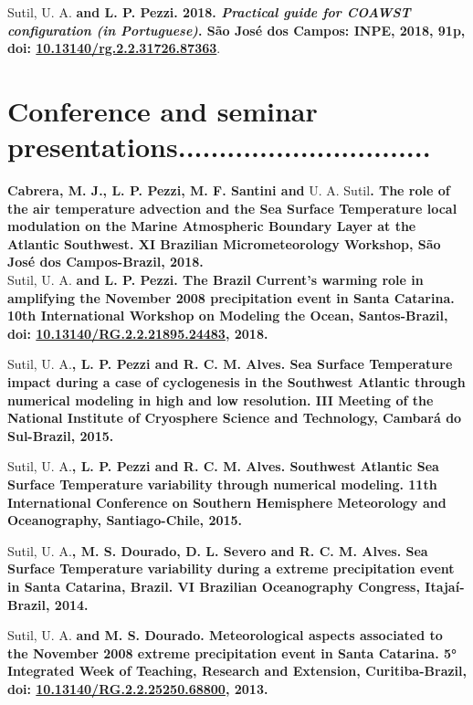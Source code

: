 \documentclass[letterpaper]{twentysecondcv} %
\begin{document}
Sutil, U. A.\textbf{ and L. P. Pezzi. 2018. \textit{Practical guide for COAWST configuration (in Portuguese)}. São José dos Campos: INPE, 2018, 91p, doi: \textcolor{mainblue}{\href{https://doi.org/10.13140/rg.2.2.31726.87363}{10.13140/rg.2.2.31726.87363}}}.


\newpage
\makeprofile
\section{Conference and seminar presentations\textcolor{maingray}{...............................}}

\textbf{Cabrera, M. J., L. P. Pezzi, M. F. Santini and} U. A. Sutil\textbf{. The role of the air temperature advection and the Sea Surface Temperature local modulation on the Marine Atmospheric Boundary Layer at the Atlantic Southwest. XI Brazilian Micrometeorology Workshop, São José dos Campos-Brazil, 2018.} \\

Sutil, U. A.\textbf{ and L. P. Pezzi. The Brazil Current's warming role in amplifying the November 2008 precipitation event in Santa Catarina. 10th International Workshop on Modeling the Ocean, Santos-Brazil, doi: \textcolor{mainblue}{\href{https://www.researchgate.net/publication/329070547_Role_of_Brazil_Current_warming_in_amplifying_2008_Santa_Catarina_extreme_precipitation_event}{10.13140/RG.2.2.21895.24483}}, 2018.}

Sutil, U. A.\textbf{, L. P. Pezzi and R. C. M. Alves. Sea Surface Temperature impact during a case of cyclogenesis in the Southwest Atlantic through numerical modeling in high and low resolution. III Meeting of the National Institute of Cryosphere Science and Technology, Cambará do Sul-Brazil, 2015.}

Sutil, U. A.\textbf{, L. P. Pezzi and R. C. M. Alves. Southwest Atlantic Sea Surface Temperature variability through numerical modeling. 11th International Conference on Southern Hemisphere Meteorology and Oceanography, Santiago-Chile, 2015.}

Sutil, U. A.\textbf{, M. S. Dourado, D. L. Severo and R. C. M. Alves. Sea Surface Temperature variability during a extreme precipitation event in Santa Catarina, Brazil. VI Brazilian Oceanography Congress, Itajaí-Brazil, 2014.}

Sutil, U. A.\textbf{ and M. S. Dourado. Meteorological aspects associated to the November 2008 extreme precipitation event in Santa Catarina. 5° Integrated Week of Teaching, Research and Extension, Curitiba-Brazil, doi: \textcolor{mainblue}{\href{https://www.researchgate.net/publication/329070463_Aspectos_meteorologicos_associados_ao_evento_extremo_de_novembro_de_2008_no_leste_do_Estado_de_Santa_Catarina}{10.13140/RG.2.2.25250.68800}}, 2013.}
\\
\\\\
\end{document}
